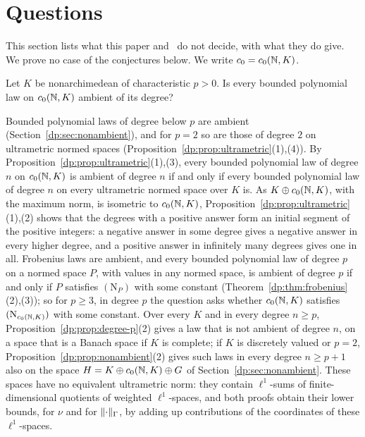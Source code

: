 \section{Questions}\label{dp:sec:questions}

This section lists what this paper and~\cite{I} do not decide, with what they do give. We prove no case of the conjectures below. We write $c_0=c_0(\mathbb N,K)$.

\begin{question}\label{q:quest:polynomial-laws}
Let $K$ be nonarchimedean of characteristic $p>0$. Is every bounded polynomial law on $c_0(\mathbb N,K)$ ambient of its degree?
\end{question}

Bounded polynomial laws of degree below $p$ are ambient (Section~\ref{dp:sec:nonambient}), and for $p=2$ so are those of degree $2$ on ultrametric normed spaces (Proposition~\ref{dp:prop:ultrametric}(1),(4)). By Proposition~\ref{dp:prop:ultrametric}(1),(3), every bounded polynomial law of degree $n$ on $c_0(\mathbb N,K)$ is ambient of degree $n$ if and only if every bounded polynomial law of degree $n$ on every ultrametric normed space over $K$ is. As $K\oplus c_0(\mathbb N,K)$, with the maximum norm, is isometric to $c_0(\mathbb N,K)$, Proposition~\ref{dp:prop:ultrametric}(1),(2) shows that the degrees with a positive answer form an initial segment of the positive integers: a negative answer in some degree gives a negative answer in every higher degree, and a positive answer in infinitely many degrees gives one in all. Frobenius laws are ambient, and every bounded polynomial law of degree $p$ on a normed space $P$, with values in any normed space, is ambient of degree $p$ if and only if $P$ satisfies $(\mathrm N_P)$ with some constant (Theorem~\ref{dp:thm:frobenius}(2),(3)); so for $p\ge3$, in degree $p$ the question asks whether $c_0(\mathbb N,K)$ satisfies $(\mathrm N_{c_0(\mathbb N,K)})$ with some constant. Over every $K$ and in every degree $n\ge p$, Proposition~\ref{dp:prop:degree-p}(2) gives a law that is not ambient of degree $n$, on a space that is a Banach space if $K$ is complete; if $K$ is discretely valued or $p=2$, Proposition~\ref{dp:prop:nonambient}(2) gives such laws in every degree $n\ge p+1$ also on the space $H=K\oplus c_0(\mathbb N,K)\oplus G$ of Section~\ref{dp:sec:nonambient}. These spaces have no equivalent ultrametric norm: they contain $\ell^1$-sums of finite-dimensional quotients of weighted $\ell^1$-spaces, and both proofs obtain their lower bounds, for $\nu$ and for $\lVert \cdot\rVert_\Gamma$, by adding up contributions of the coordinates of these $\ell^1$-spaces.

